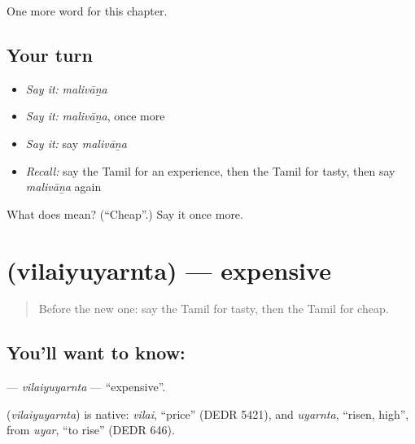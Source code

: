 \begin{grammarlens}[title={What you've built}]
One more word for this chapter.
\end{grammarlens}

\subsection*{Your turn}
\begin{itemize}
\raggedright
  \item \emph{Say it:} \emph{malivāṉa}
  \item \emph{Say it:} \emph{malivāṉa}, once more
  \item \emph{Say it:} say \emph{malivāṉa}
  \item \emph{Recall:} say the Tamil for an experience, then the Tamil for tasty, then say \emph{malivāṉa} again
\end{itemize}

\begin{tcolorbox}[breakable,colback=teal!4,colframe=teal!35!black,title={Before you move on}]
What does  mean? (\textquotedblleft{}Cheap\textquotedblright{}.) Say it once more.
\end{tcolorbox}
\section[\texorpdfstring{\ta{விலையுயர்ந்த} (vilaiyuyarnta)}{விலையுயர்ந்த (vilaiyuyarnta)}]{ (vilaiyuyarnta) — expensive}

\label{lesson:TA-C178-vilaiyuyarnta}



\begin{quote}
Before the new one: say the Tamil for tasty, then the Tamil for cheap.
\end{quote}

\subsection*{You'll want to know: }
\textbf{} — \emph{vilaiyuyarnta} — \textquotedblleft{}expensive\textquotedblright{}.

\begin{cousinweb}
\textbf{} (\emph{vilaiyuyarnta}) is native: \emph{vilai}, \textquotedblleft{}price\textquotedblright{} (DEDR 5421), and \emph{uyarnta}, \textquotedblleft{}risen, high\textquotedblright{}, from \emph{uyar}, \textquotedblleft{}to rise\textquotedblright{} (DEDR 646).
\end{cousinweb}

